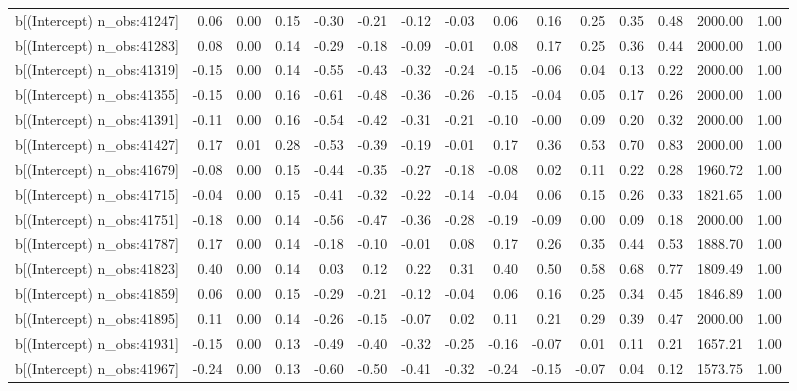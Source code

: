 \begin{table}[ht]
\begin{tabular}{rrrrrrrrrrrrrrr}
  b[(Intercept) n\_obs:41247] & 0.06 & 0.00 & 0.15 & -0.30 & -0.21 & -0.12 & -0.03 & 0.06 & 0.16 & 0.25 & 0.35 & 0.48 & 2000.00 & 1.00 \\ 
  b[(Intercept) n\_obs:41283] & 0.08 & 0.00 & 0.14 & -0.29 & -0.18 & -0.09 & -0.01 & 0.08 & 0.17 & 0.25 & 0.36 & 0.44 & 2000.00 & 1.00 \\ 
  b[(Intercept) n\_obs:41319] & -0.15 & 0.00 & 0.14 & -0.55 & -0.43 & -0.32 & -0.24 & -0.15 & -0.06 & 0.04 & 0.13 & 0.22 & 2000.00 & 1.00 \\ 
  b[(Intercept) n\_obs:41355] & -0.15 & 0.00 & 0.16 & -0.61 & -0.48 & -0.36 & -0.26 & -0.15 & -0.04 & 0.05 & 0.17 & 0.26 & 2000.00 & 1.00 \\ 
  b[(Intercept) n\_obs:41391] & -0.11 & 0.00 & 0.16 & -0.54 & -0.42 & -0.31 & -0.21 & -0.10 & -0.00 & 0.09 & 0.20 & 0.32 & 2000.00 & 1.00 \\ 
  b[(Intercept) n\_obs:41427] & 0.17 & 0.01 & 0.28 & -0.53 & -0.39 & -0.19 & -0.01 & 0.17 & 0.36 & 0.53 & 0.70 & 0.83 & 2000.00 & 1.00 \\ 
  b[(Intercept) n\_obs:41679] & -0.08 & 0.00 & 0.15 & -0.44 & -0.35 & -0.27 & -0.18 & -0.08 & 0.02 & 0.11 & 0.22 & 0.28 & 1960.72 & 1.00 \\ 
  b[(Intercept) n\_obs:41715] & -0.04 & 0.00 & 0.15 & -0.41 & -0.32 & -0.22 & -0.14 & -0.04 & 0.06 & 0.15 & 0.26 & 0.33 & 1821.65 & 1.00 \\ 
  b[(Intercept) n\_obs:41751] & -0.18 & 0.00 & 0.14 & -0.56 & -0.47 & -0.36 & -0.28 & -0.19 & -0.09 & 0.00 & 0.09 & 0.18 & 2000.00 & 1.00 \\ 
  b[(Intercept) n\_obs:41787] & 0.17 & 0.00 & 0.14 & -0.18 & -0.10 & -0.01 & 0.08 & 0.17 & 0.26 & 0.35 & 0.44 & 0.53 & 1888.70 & 1.00 \\ 
  b[(Intercept) n\_obs:41823] & 0.40 & 0.00 & 0.14 & 0.03 & 0.12 & 0.22 & 0.31 & 0.40 & 0.50 & 0.58 & 0.68 & 0.77 & 1809.49 & 1.00 \\ 
  b[(Intercept) n\_obs:41859] & 0.06 & 0.00 & 0.15 & -0.29 & -0.21 & -0.12 & -0.04 & 0.06 & 0.16 & 0.25 & 0.34 & 0.45 & 1846.89 & 1.00 \\ 
  b[(Intercept) n\_obs:41895] & 0.11 & 0.00 & 0.14 & -0.26 & -0.15 & -0.07 & 0.02 & 0.11 & 0.21 & 0.29 & 0.39 & 0.47 & 2000.00 & 1.00 \\ 
  b[(Intercept) n\_obs:41931] & -0.15 & 0.00 & 0.13 & -0.49 & -0.40 & -0.32 & -0.25 & -0.16 & -0.07 & 0.01 & 0.11 & 0.21 & 1657.21 & 1.00 \\ 
  b[(Intercept) n\_obs:41967] & -0.24 & 0.00 & 0.13 & -0.60 & -0.50 & -0.41 & -0.32 & -0.24 & -0.15 & -0.07 & 0.04 & 0.12 & 1573.75 & 1.00 \\ 

\end{tabular}
\end{table}
